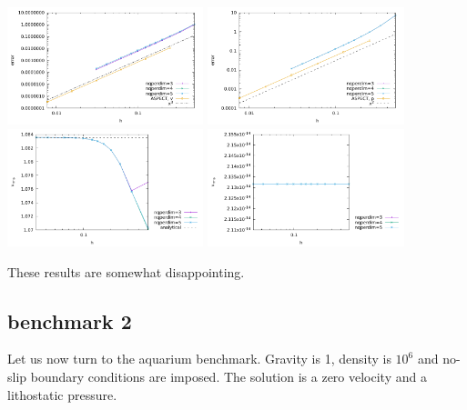 \begin{center}
\includegraphics[width=5.7cm]{python_codes/fieldstone_133/results/bench1/DJ/errors_v.pdf}
\includegraphics[width=5.7cm]{python_codes/fieldstone_133/results/bench1/DJ/errors_p.pdf}\\
\includegraphics[width=5.7cm]{python_codes/fieldstone_133/results/bench1/DJ/vrms.pdf}
\includegraphics[width=5.7cm]{python_codes/fieldstone_133/results/bench1/DJ/area.pdf}
\end{center}

These results are somewhat disappointing.

\subsection*{benchmark 2}

Let us now turn to the aquarium benchmark. Gravity is 1, density is $10^6$ and no-slip
boundary conditions are imposed. The solution is a zero velocity and a lithostatic pressure.

